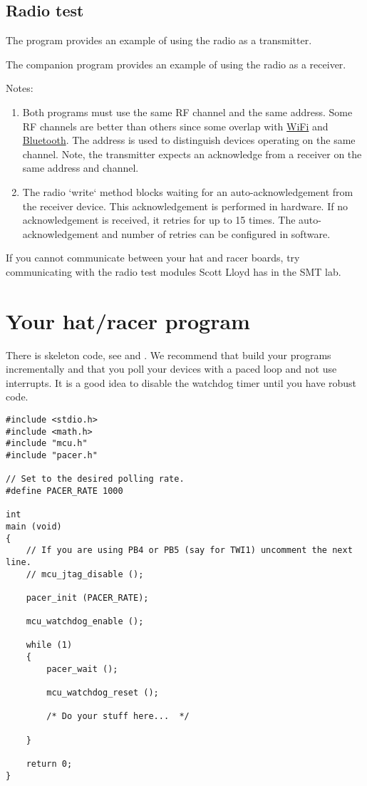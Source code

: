 \subsection{Radio test}
\label{radio-test}

The program  provides
an example of using the radio as a transmitter.

The companion program
 provides an example
of using the radio as a receiver.

Notes:
%
\begin{enumerate}
\item
  Both programs must use the same RF channel and the same address. Some
  RF channels are better than others since some overlap with \url{WiFi}
  and \url{Bluetooth}. The address is used to distinguish devices
  operating on the same channel. Note, the transmitter expects an
  acknowledge from a receiver on the same address and channel.
\item
  The radio `write` method blocks waiting for an auto-acknowledgement
  from the receiver device. This acknowledgement is performed in
  hardware. If no acknowledgement is received, it retries for up to 15
  times. The auto-acknowledgement and number of retries can be
  configured in software.
\end{enumerate}

If you cannot communicate between your hat and racer boards, try
communicating with the radio test modules Scott Lloyd has in the SMT
lab.

\section{Your hat/racer program}
\label{your-hatracer-program}

There is skeleton code, see
 and
. We recommend that
build your programs incrementally and that you poll your devices with a
paced loop and not use interrupts. It is a good idea to disable the
watchdog timer until you have robust code.

\begin{verbatim}
#include <stdio.h>
#include <math.h>
#include "mcu.h"
#include "pacer.h"

// Set to the desired polling rate.
#define PACER_RATE 1000

int
main (void)
{
    // If you are using PB4 or PB5 (say for TWI1) uncomment the next line.
    // mcu_jtag_disable ();    

    pacer_init (PACER_RATE);    
    
    mcu_watchdog_enable ();

    while (1)
    {
        pacer_wait ();

        mcu_watchdog_reset ();

        /* Do your stuff here...  */
        
    }
    
    return 0;
}
\end{verbatim}

